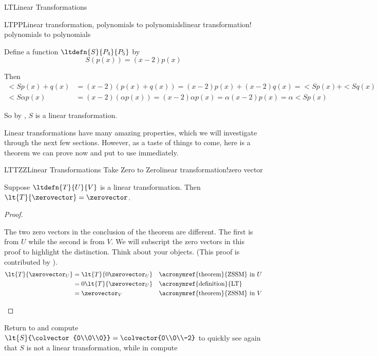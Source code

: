 \begin{subsect}{LT}{Linear Transformations}
\begin{example}{LTPP}{Linear transformation, polynomials to polynomials}{linear transformation! polynomials to polynomials}
\begin{para}Define a function $\ltdefn{S}{P_4}{P_5}$ by
%
\begin{equation*}
S(p(x))=(x-2)p(x)
\end{equation*}
\end{para}
%
\begin{para}Then
%
\begin{align*}
\lt{S}{p(x)+q(x)}&=(x-2)(p(x)+q(x))=(x-2)p(x)+(x-2)q(x)=\lt{S}{p(x)}+\lt{S}{q(x)}\\
\lt{S}{\alpha p(x)}&=(x-2)(\alpha p(x))=(x-2)\alpha p(x)=\alpha(x-2)p(x)=\alpha\lt{S}{p(x)}
\end{align*}
\end{para}
%
\begin{para}So by , $S$ is a linear transformation.\end{para}
%
\end{example}
%
\begin{para}Linear transformations have many amazing properties, which we will investigate through the next few sections.  However, as a taste of things to come, here is a theorem we can prove now and put to use immediately.\end{para}
%
\begin{theorem}{LTTZZ}{Linear Transformations Take Zero to Zero}{linear transformation!zero vector}
\begin{para}Suppose $\ltdefn{T}{U}{V}$ is a linear transformation.  Then $\lt{T}{\zerovector}=\zerovector$.\end{para}
\end{theorem}
%
\begin{proof}
\begin{para}The two zero vectors in the conclusion of the theorem are different.  The first is from $U$ while the second is from $V$.  We will subscript the zero vectors in this proof to highlight the distinction.  Think about your objects.  (This proof is contributed by \markshoemaker).
%
\begin{align*}
\lt{T}{\zerovector_U}
&=\lt{T}{0\zerovector_U}
&&\text{\acronymref{theorem}{ZSSM} in $U$}\\
%
&=0\lt{T}{\zerovector_U}
&&\text{\acronymref{definition}{LT}}\\
%
&=\zerovector_V
&&\text{\acronymref{theorem}{ZSSM} in $V$}
%
\end{align*}
\end{para}
%
\end{proof}
%
\begin{para}Return to  and compute $\lt{S}{\colvector{0\\0\\0}}=\colvector{0\\0\\-2}$ to quickly see again that $S$ is not a linear transformation, while in   compute

\end{para}
\end{subsect}
